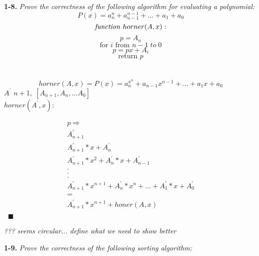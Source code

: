 \textbf{1-8.} \emph{Prove the correctness of the following algorithm for evaluating a polynomial:}
$$P(x) = a_{n}^{n} + a_{n-1}^{n-1} + ... +a_{1} + a_{0}$$ 
$$\text{\emph{function} } horner(A, x):$$  
$$p = A_{n}$$  
$$\text{for } i \text{ from } n - 1 \;to\; 0$$ 
$$p = px + A_{i}$$ 
$$\text{return } p$$ 
\\
\\
$$
	horner(A,x) = P(x) = a_{n}^{x^n} + a_{n-1}x^{n-1} + ... + a_{1}x + a_{0}
$$
$A^{'}$
$n + 1, \; [A_{n+1}, A_{n}, ... A_{0}]$ \\
\textbf{$horner(A^{'}, x) :$}
\begin{flushleft}
\begin{align*}
p \Rightarrow \\
	A^{'}_{n+1} \\
	A^{'}_{n+1}*x + A^{'}_{n} \\
	A^{'}_{n+1}*x^{2} + A^{'}_{n}*x + A^{'}_{n-1} \\
	. \\
	. \\
	. \\
	A^{'}_{n+1}*x^{n+1} + A^{'}_{n}*x^{n} + ... + A^{'}_{1}*x + A^{'}_{0} \\
	= \\
	A^{'}_{n+1}*x^{n+1} + honer(A, x) \\
\end{align*}
$\;\; \blacksquare$
\end{flushleft}
\emph{??? seems circular... define what we need to show better}

 	
 		


\textbf{1-9.} \emph{Prove the correctness of the following sorting algorithm:} \\
 \\
 \\
 \\
 \\
 \\
 \\


